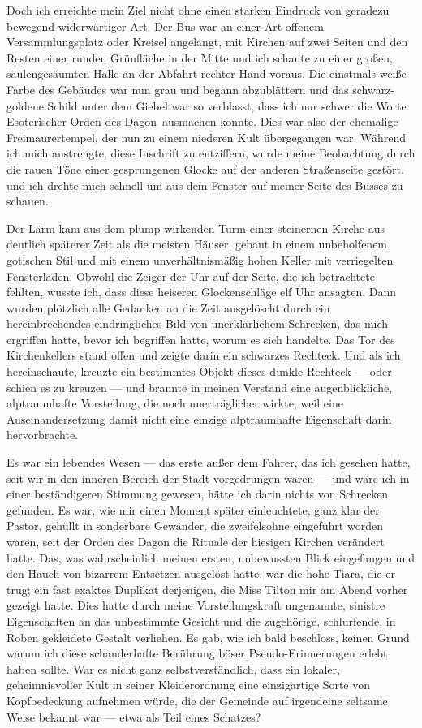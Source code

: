 Doch ich erreichte mein Ziel nicht ohne einen starken Eindruck von geradezu bewegend widerwärtiger Art. Der Bus war an einer Art offenem Versammlungsplatz oder Kreisel angelangt, mit Kirchen auf zwei Seiten und den Resten einer runden Grünfläche in der Mitte und ich schaute zu einer großen, säulengesäumten Halle an der Abfahrt rechter Hand voraus. Die einstmals weiße Farbe des Gebäudes war nun grau und begann abzublättern und das schwarz-goldene Schild unter dem Giebel war so verblasst, dass ich nur schwer die Worte \glqq Esoterischer
Orden des Dagon\grqq\ ausmachen konnte. Dies war also der ehemalige Freimaurertempel, der nun zu einem niederen Kult übergegangen war. Während ich mich anstrengte, diese Inschrift zu entziffern, wurde meine Beobachtung durch die rauen Töne einer gesprungenen Glocke auf der anderen Straßenseite gestört. und ich drehte mich schnell um aus dem Fenster auf meiner Seite des Busses zu  schauen.

Der Lärm kam aus dem plump wirkenden Turm einer steinernen Kirche aus deutlich späterer Zeit als die meisten Häuser, gebaut in einem unbeholfenem gotischen Stil und mit einem unverhältnismäßig hohen Keller mit verriegelten Fensterläden. Obwohl die Zeiger der Uhr auf der Seite, die ich betrachtete fehlten, wusste ich, dass diese heiseren Glockenschläge elf Uhr ansagten. Dann wurden plötzlich alle Gedanken an die Zeit ausgelöscht durch ein hereinbrechendes eindringliches Bild von unerklärlichem Schrecken, das mich ergriffen hatte, bevor ich begriffen hatte, worum es sich handelte. Das Tor des Kirchenkellers stand offen und zeigte darin ein schwarzes Rechteck. Und als ich hereinschaute, kreuzte ein bestimmtes Objekt dieses dunkle Rechteck --- oder schien es zu kreuzen --- und brannte in meinen Verstand eine augenblickliche, alptraumhafte Vorstellung, die noch unerträglicher wirkte, weil eine Auseinandersetzung damit nicht eine einzige alptraumhafte Eigenschaft darin hervorbrachte.

Es war ein lebendes Wesen --- das erste außer dem Fahrer, das ich gesehen hatte, seit wir in den inneren Bereich der Stadt vorgedrungen waren --- und wäre ich in einer beständigeren Stimmung gewesen, hätte ich darin nichts von Schrecken gefunden. Es war, wie mir einen Moment später einleuchtete, ganz klar der Pastor, gehüllt in sonderbare Gewänder, die zweifelsohne eingeführt worden waren, seit der Orden des Dagon die Rituale der hiesigen Kirchen verändert hatte. Das, was wahrscheinlich meinen ersten, unbewussten Blick eingefangen und den Hauch von bizarrem Entsetzen ausgelöst hatte, war die hohe Tiara, die er trug; ein fast exaktes Duplikat derjenigen, die Miss Tilton mir am Abend vorher gezeigt hatte. Dies hatte durch meine Vorstellungskraft ungenannte, sinistre Eigenschaften an das unbestimmte Gesicht und die zugehörige, schlurfende, in Roben gekleidete Gestalt verliehen. Es gab, wie ich bald beschloss, keinen Grund warum ich diese schauderhafte Berührung böser Pseudo-Erinnerungen erlebt haben sollte. War es nicht ganz selbstverständlich, dass ein lokaler, geheimnisvoller Kult in seiner Kleiderordnung eine einzigartige Sorte von Kopfbedeckung aufnehmen würde, die der Gemeinde auf irgendeine seltsame Weise bekannt war --- etwa als Teil eines Schatzes?

